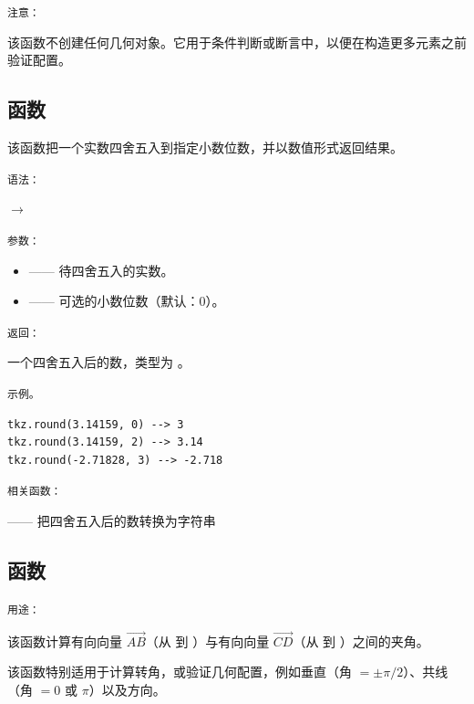 \medskip
\texttt{注意：}

该函数不创建任何几何对象。它用于条件判断或断言中，以便在构造更多元素之前验证配置。

\subsection{函数 }
\label{sub:function_tkz_round}

该函数把一个实数四舍五入到指定小数位数，并以数值形式返回结果。

\medskip
\texttt{语法：}

\begin{center}
 \hspace{4em} $\rightarrow$ 
\end{center}


\texttt{参数：}

\begin{itemize}
\item {} —— 待四舍五入的实数。
\item {} —— 可选的小数位数（默认：0）。
\end{itemize}

\medskip
\texttt{返回：}

一个四舍五入后的数，类型为 。

\medskip
\texttt{示例。}

\begin{verbatim}
tkz.round(3.14159, 0) --> 3
tkz.round(3.14159, 2) --> 3.14
tkz.round(-2.71828, 3) --> -2.718
\end{verbatim}

\medskip
\texttt{相关函数：}

  —— 把四舍五入后的数转换为字符串


\subsection{函数 }
\label{sub:angle_between_vectors}

\texttt{用途：}

该函数计算有向向量 $\vec{AB}$（从  到 ）与有向向量 $\vec{CD}$（从  到 ）之间的夹角。

该函数特别适用于计算转角，或验证几何配置，例如垂直（角 $=\pm\pi/2$）、共线（角 $=0$ 或 $\pi$）以及方向。

